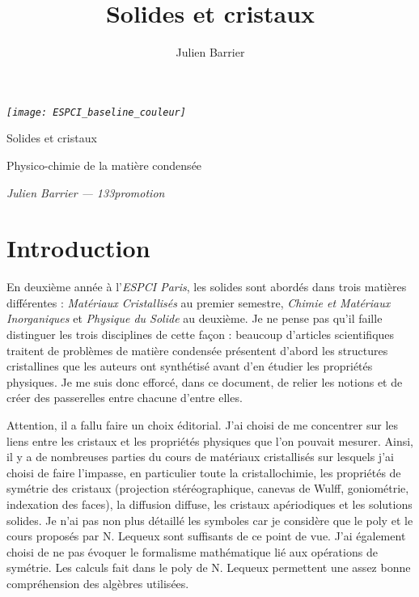 \documentclass[a4paper,justified,twoside,nobib]{tufte-book}
\title{Solides et cristaux}
\author[Julien Barrier]{Julien Barrier}
\newcommand{\thetitle}{Solides et cristaux}
\newcommand{\theauthor}{Julien Barrier --- 133\ieme promotion}
\newcommand{\thesubtitle}{Physico-chimie de la matière condensée}
\newcommand{\pc}{l'\textit{ESPCI Paris}\xspace}
\renewcommand{\=}[1]{\stackrel{#1}{=}} %
\begin{document}
\frontmatter

\thispagestyle{empty}
\begin{fullwidth}
\setlength{\parindent}{0pt}

\begin{center}\fontsize{24}{24}\selectfont\textit{\texttt{[image: ESPCI\_baseline\_couleur]}}
\end{center}

\vspace{3in}\fontsize{36}{54}\selectfont\thetitle

\vspace{0.125in}\fontsize{18}{18}\selectfont\thesubtitle

\vfill\fontsize{14}{14}\selectfont\textit{\theauthor}
\end{fullwidth}

\newpage


\cleardoublepage
\chapter*{Introduction}
En deuxième année à \pc, les solides sont abordés dans trois matières 
différentes : \emph{Matériaux Cristallisés} au premier semestre, 
\emph{Chimie et Matériaux Inorganiques} et \emph{Physique du Solide} au 
deuxième. Je ne pense pas qu'il faille distinguer les trois disciplines de cette
façon : beaucoup d'articles scientifiques traitent de problèmes de matière 
condensée présentent d'abord les structures cristallines que les auteurs ont 
synthétisé avant d'en étudier les propriétés physiques. Je me suis donc efforcé,
dans ce document, de relier les notions et de créer des passerelles entre 
chacune d'entre elles.

Attention, il a fallu faire un choix éditorial. J'ai choisi de me concentrer
sur les liens entre les cristaux et les propriétés physiques que l'on pouvait
mesurer. Ainsi, il y a de nombreuses parties du cours de matériaux cristallisés
sur lesquels j'ai choisi de faire l'impasse, en particulier toute la
cristallochimie, les propriétés de symétrie des cristaux (projection
stéréographique, canevas de Wulff, goniométrie, indexation des faces), la 
diffusion diffuse, les cristaux apériodiques et les solutions solides. Je n'ai
pas non plus détaillé les symboles car je considère que le poly et le cours 
proposés par N. Lequeux sont suffisants de ce point de vue. J'ai également choisi
de ne pas évoquer le formalisme mathématique lié aux opérations de symétrie.
Les calculs fait dans le poly de N. Lequeux permettent une assez bonne compréhension
des algèbres utilisées.
\end{document}
